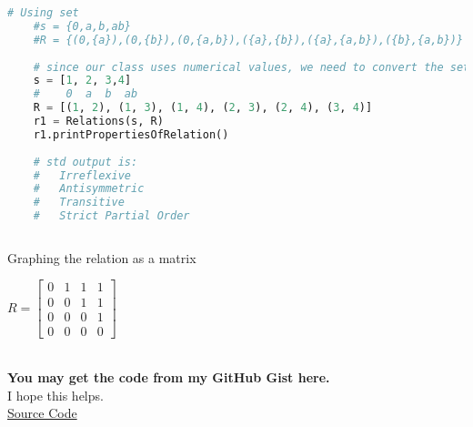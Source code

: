 \begin{lstlisting}[language=Python]
    # Using set
    #s = {0,a,b,ab}
    #R = {(0,{a}),(0,{b}),(0,{a,b}),({a},{b}),({a},{a,b}),({b},{a,b})}
    
    # since our class uses numerical values, we need to convert the set to a list of numbers and tuples of ordered pairs
    s = [1, 2, 3,4]
    #    0  a  b  ab
    R = [(1, 2), (1, 3), (1, 4), (2, 3), (2, 4), (3, 4)]
    r1 = Relations(s, R)
    r1.printPropertiesOfRelation()
    
    # std output is:
    #   Irreflexive
    #   Antisymmetric
    #   Transitive
    #   Strict Partial Order
    
\end{lstlisting}

Graphing the relation as a matrix

$R = \begin{bmatrix}
0 & 1 & 1 & 1 \\
0 & 0 & 1 & 1 \\
0 & 0 & 0 & 1 \\
0 & 0 & 0 & 0
\end{bmatrix}$ \\


 \\

 





\textbf{You may get the code from my GitHub Gist here.} \\

I hope this helps. \\

\href{https://gist.github.com/adgsenpai/4d8b24def8ffdcf82cc1cf43d8d89808}{Source Code}
